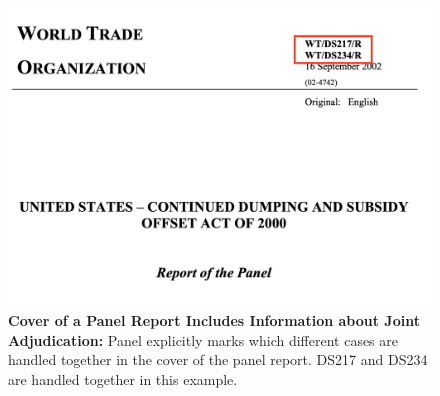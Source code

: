 \begin{figure}[h]
   \centering
   \includegraphics[scale=0.35]{Data/pngs/linked_cases.png}
   \caption{\textbf{Cover of a Panel Report Includes Information about Joint Adjudication:}
       Panel explicitly marks which different cases are handled together in the cover of the panel report. DS217 and DS234 are handled together in this example.
       }
   \label{fig:linked-cases}
\end{figure}
 
 
 
 

